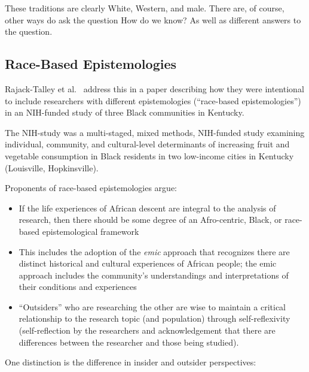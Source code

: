 \documentclass[
  english,
]{book}
\providecommand{\tightlist}{%
  \setlength{\itemsep}{0pt}\setlength{\parskip}{0pt}}
\begin{document}
These traditions are clearly White, Western, and male. There are, of course, other ways do ask the question How do we know? As well as different answers to the question.

\hypertarget{race-based-epistemologies}{%
\subsection{Race-Based Epistemologies}\label{race-based-epistemologies}}

Rajack-Talley et al.~\citeyearpar{rajack-talley_epistemological_2017} address this in a paper describing how they were intentional to include researchers with different epistemologies (``race-based epistemologies'') in an NIH-funded study of three Black communities in Kentucky.

The NIH-study \citep{della_modeling_2016} was a multi-staged, mixed methods, NIH-funded study examining individual, community, and cultural-level determinants of increasing fruit and vegetable consumption in Black residents in two low-income cities in Kentucky (Louisville, Hopkinsville).

Proponents of race-based epistemologies argue:

\begin{itemize}
\tightlist
\item
  If the life experiences of African descent are integral to the analysis of research, then there should be some degree of an Afro-centric, Black, or race-based epistemological framework
\item
  This includes the adoption of the \emph{emic} approach that recognizes there are distinct historical and cultural experiences of African people; the emic approach includes the community's understandings and interpretations of their conditions and experiences
\item
  ``Outsiders'' who are researching the other are wise to maintain a critical relationship to the research topic (and population) through self-reflexivity (self-reflection by the researchers and acknowledgement that there are differences between the researcher and those being studied).
\end{itemize}

One distinction is the difference in insider and outsider perspectives:
\end{document}
